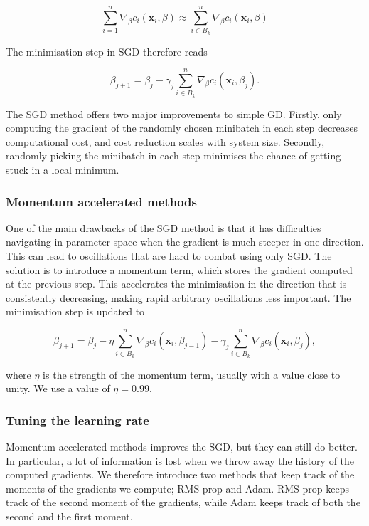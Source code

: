 \documentclass[a4paper, 
amsfonts, 
amssymb, 
amsmath, 
reprint, 
showkeys, 
nofootinbib, 
twoside]{revtex4-2}
\begin{document}
\begin{equation}
    \sum_{i = 1}^n \nabla_{\beta}c_i(\bm{x}_i, \beta) \approx \sum_{i \in B_k}^n \nabla_{\beta}c_i(\bm{x}_i, \beta)
\end{equation} 

The minimisation step in SGD therefore reads

\begin{equation}
    \beta_{j+1} = \beta_j - \gamma_j  \sum_{i \in B_k}^n \nabla_{\beta}c_i(\bm{x}_i, \beta_j).
\end{equation}

The SGD method offers two major improvements to simple GD. Firstly, only computing the gradient of the randomly chosen minibatch in each step decreases computational cost, and cost reduction scales with system size. Secondly, randomly picking the minibatch in each step minimises the chance of getting stuck in a local minimum. 

\subsubsection{Momentum accelerated methods}

One of the main drawbacks of the SGD method is that it has difficulties navigating in parameter space when the gradient is much steeper in one direction. This can lead to oscillations that are hard to combat using only SGD. The solution is to introduce a momentum term, which stores the gradient computed at the previous step. This accelerates the minimisation in the direction that is consistently decreasing, making rapid arbitrary oscillations less important. The minimisation step is updated to    

\begin{equation}
    \beta_{j+1} = \beta_j - \eta \sum_{i \in B_k}^n \nabla_{\beta}c_i(\bm{x}_i, \beta_{j-1})  - \gamma_j  \sum_{i \in B_k}^n \nabla_{\beta}c_i(\bm{x}_i, \beta_j),
\end{equation}

where $\eta$ is the strength of the momentum term, usually with a value close to unity. We use a value of $\eta = 0.99$.

\subsubsection{Tuning the learning rate}

Momentum accelerated methods improves the SGD, but they can still do better. In particular, a lot of information is lost when we throw away the history of the computed gradients. We therefore introduce two methods that keep track of the moments of the gradients we compute; RMS prop and Adam. RMS prop keeps track of the second moment of the gradients, while Adam keeps track of both the second and the first moment. 
\end{document}
